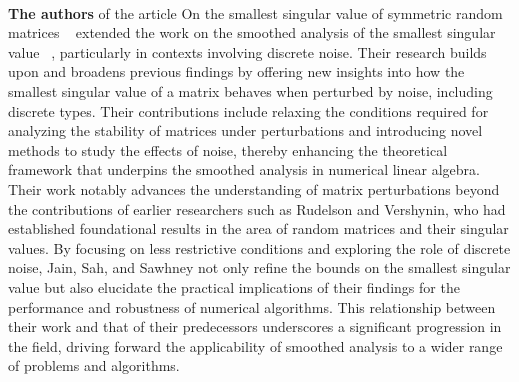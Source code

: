 \\\newline\textbf{The authors} of the article On the smallest singular value of symmetric random matrices ~\cite{jain2020smallest} extended the work on the smoothed analysis of the smallest singular value ~\cite{jain2020smoothed}, particularly in contexts involving discrete noise. 
Their research builds upon and broadens previous findings by offering new insights into how the smallest singular value of a matrix behaves when perturbed by noise, including discrete types. 
Their contributions include relaxing the conditions required for analyzing the stability of matrices under perturbations and introducing novel methods to study the effects of noise, thereby enhancing the theoretical framework that underpins the smoothed analysis in numerical linear algebra.\\
Their work notably advances the understanding of matrix perturbations beyond the contributions of earlier researchers such as Rudelson and Vershynin, who had established foundational results in the area of random matrices and their singular values. By focusing on less restrictive conditions and exploring the role of discrete noise, Jain, Sah, and Sawhney not only refine the bounds on the smallest singular value but also elucidate the practical implications of their findings for the performance and robustness of numerical algorithms. This relationship between their work and that of their predecessors underscores a significant progression in the field, driving forward the applicability of smoothed analysis to a wider range of problems and algorithms.